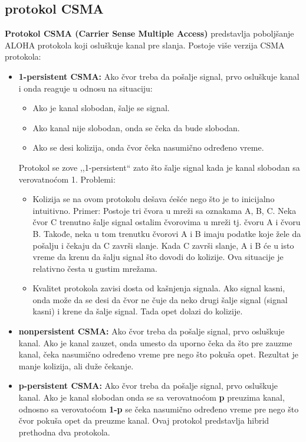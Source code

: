 \documentclass[a4paper]{article}
\begin{document}
    \subsection{protokol CSMA}
        \textbf{Protokol CSMA (Carrier Sense Multiple Access)} predstavlja poboljšanje ALOHA protokola
        koji osluškuje kanal pre slanja. Postoje više verzija CSMA protokola:
        \begin{itemize}
            \item \textbf{1-persistent CSMA:} Ako čvor treba da pošalje signal, prvo osluškuje
                  kanal i onda reaguje u odnosu na situaciju:
                  \begin{itemize} 
                    \item Ako je kanal slobodan, šalje se signal. 
                    \item Ako kanal nije slobodan, onda se čeka da bude slobodan. 
                    \item Ako se desi kolizija, onda čvor čeka nasumično određeno vreme.
                  \end{itemize}
                  Protokol se zove ,,1-persistent`` zato što šalje signal kada je kanal slobodan
                  sa verovatnoćom 1. Problemi: 
                  \begin{itemize}
                      \item Kolizija se na ovom protokolu dešava ćešće nego što je to inicijalno
                            intuitivno. Primer: Postoje tri čvora u mreži sa oznakama A, B, C.
                            Neka čvor C trenutno šalje signal ostalim čvorovima u mreži tj. 
                            čvoru A i čvoru B. Takođe, neka u tom trenutku čvorovi A i B imaju
                            podatke koje žele da pošalju i čekaju da C završi slanje.
                            Kada C završi slanje, A i B će u isto vreme da krenu da šalju signal
                            što dovodi do kolizije. Ova situacije je relativno česta u gustim
                            mrežama.
                      \item Kvalitet protokola zavisi dosta od kašnjenja signala. Ako signal kasni,
                            onda može da se desi da čvor ne čuje da neko drugi šalje signal (signal
                            kasni) i krene da šalje signal. Tada opet dolazi do kolizije.
                  \end{itemize}
            \item \textbf{nonpersistent CSMA:} Ako čvor treba da pošalje signal, prvo osluškuje
                  kanal. Ako je kanal zauzet, onda umesto da uporno čeka da što pre zauzme kanal,
                  čeka nasumično određeno vreme pre nego što pokuša opet. Rezultat je manje kolizija,
                  ali duže čekanje.
            \item \textbf{p-persistent CSMA:} Ako čvor treba da pošalje signal, prvo osluškuje 
                  kanal. Ako je kanal slobodan onda se sa verovatnoćom \textbf{p} preuzima kanal,
                  odnosno sa verovatoćom \textbf{1-p} se čeka nasumično određeno vreme pre nego
                  što čvor pokuša opet da preuzme kanal. Ovaj protokol predstavlja hibrid 
                  prethodna dva protokola. 
        \end{itemize}
\end{document}
